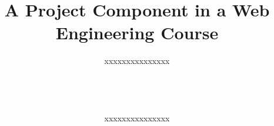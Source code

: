\documentclass{sig-alternate}
\newif\ifisnopii
\begin{document}
%

\title{A Project Component in a Web Engineering Course}
\ifisnopii %
\author{
%
\alignauthor
Daniel~E.~Krutz~and~Samuel~A.~Malachowsky\\ 	
	\affaddr{Software Engineering Department}\\
       \affaddr{Rochester Institute of Technology}\\
       \affaddr{1 Lomb Memorial Drive}\\
       \affaddr{Rochester, NY, USA} \\
       \email{\{dxkvse, samvse\}@rit.edu}
} %

\else %
\author{
%
\alignauthor
xxxxxxxxxxxxxxx\\ 	
	\\
       \\
       \\
        \\
       \alignauthor
xxxxxxxxxxxxxxx\\
        \\
       \\
        \\
        \\
} %
\fi %
\end{document}
